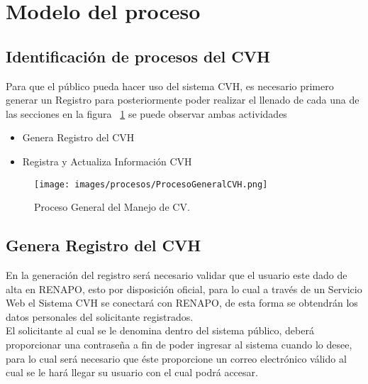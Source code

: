 \section{Modelo del proceso}

\subsection{Identificación de procesos del CVH}

Para que el público pueda hacer uso del sistema CVH, es necesario primero generar un Registro para posteriormente poder realizar el llenado de cada una de las secciones en la figura ~\ref{fig:ProcesoGeneralCVH} se puede observar ambas actividades
\begin{itemize}
	\item Genera Registro  del CVH
	\item Registra y Actualiza Información CVH
\end{itemize}

\begin{figure}[htbp]
  \begin{center}
    \texttt{[image: images/procesos/ProcesoGeneralCVH.png]}
    \caption{Proceso General del Manejo de CV.}
    \label{fig:ProcesoGeneralCVH}
  \end{center}
\end{figure}



\subsection{Genera Registro  del CVH}	
En la generación del registro será necesario validar que el usuario este dado de alta en RENAPO, esto por disposición oficial, para lo cual a través de un Servicio Web el Sistema CVH se conectará con RENAPO, de esta forma se obtendrán los datos personales del solicitante registrados.\\

El solicitante al cual se le denomina dentro del sistema público, deberá proporcionar una contraseña a fin de poder ingresar al sistema cuando lo desee, para lo cual será necesario que éste proporcione un correo electrónico válido al cual se le hará llegar su usuario con el cual podrá accesar. \\ 


